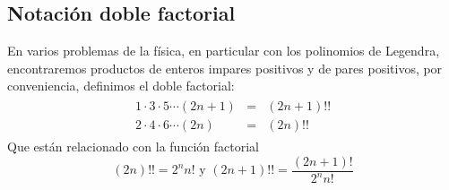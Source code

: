 \subsection{Notación doble factorial}
En varios problemas de la física, en particular con los polinomios de Legendra, encontraremos productos de enteros impares positivos y de pares positivos, por conveniencia, definimos el doble factorial:
\begin{eqnarray}
\begin{aligned}
1 \cdot 3 \cdot 5 \cdots (2n+1) &=& (2n+1) !! \\
2 \cdot 4 \cdot 6 \cdots (2n) &=& (2n) !!
\end{aligned}
\end{eqnarray}
Que están relacionado con la función factorial
\begin{equation}
(2n)!! =  2^{n} n! \text{ y } (2n+1)!! = \dfrac{(2n+1)!}{2^{n}n!}
\end{equation}

